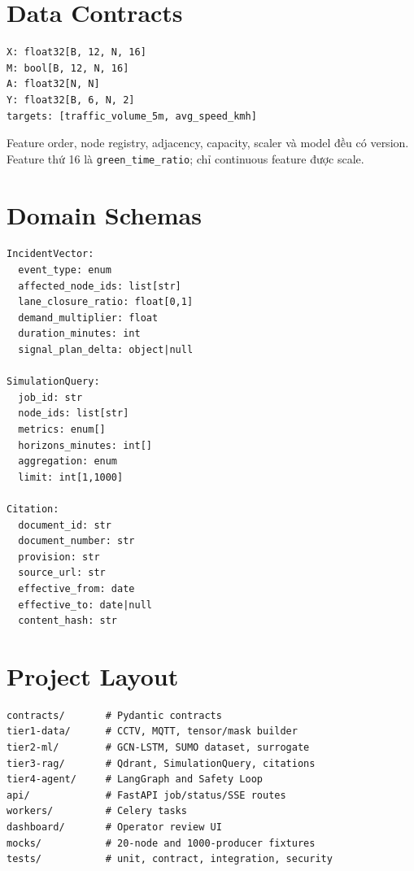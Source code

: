 \section{Data Contracts}

\begin{lstlisting}[caption={Hợp đồng tensor}]
X: float32[B, 12, N, 16]
M: bool[B, 12, N, 16]
A: float32[N, N]
Y: float32[B, 6, N, 2]
targets: [traffic_volume_5m, avg_speed_kmh]
\end{lstlisting}

Feature order, node registry, adjacency, capacity, scaler và model đều có version. Feature thứ 16 là \texttt{green\_time\_ratio}; chỉ continuous feature được scale.

\section{Domain Schemas}

\begin{lstlisting}[caption={Các schema cốt lõi}]
IncidentVector:
  event_type: enum
  affected_node_ids: list[str]
  lane_closure_ratio: float[0,1]
  demand_multiplier: float
  duration_minutes: int
  signal_plan_delta: object|null

SimulationQuery:
  job_id: str
  node_ids: list[str]
  metrics: enum[]
  horizons_minutes: int[]
  aggregation: enum
  limit: int[1,1000]

Citation:
  document_id: str
  document_number: str
  provision: str
  source_url: str
  effective_from: date
  effective_to: date|null
  content_hash: str
\end{lstlisting}

\section{Project Layout}

\begin{lstlisting}
contracts/       # Pydantic contracts
tier1-data/      # CCTV, MQTT, tensor/mask builder
tier2-ml/        # GCN-LSTM, SUMO dataset, surrogate
tier3-rag/       # Qdrant, SimulationQuery, citations
tier4-agent/     # LangGraph and Safety Loop
api/             # FastAPI job/status/SSE routes
workers/         # Celery tasks
dashboard/       # Operator review UI
mocks/           # 20-node and 1000-producer fixtures
tests/           # unit, contract, integration, security
\end{lstlisting}
